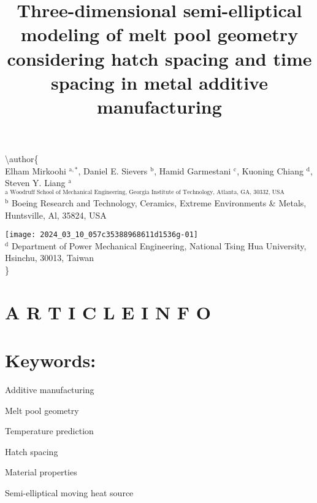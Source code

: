 \documentclass[10pt]{article}
\title{Three-dimensional semi-elliptical modeling of melt pool geometry considering hatch spacing and time spacing in metal additive manufacturing }
\author{}
\date{}
\begin{document}
\maketitle
\textbackslash author\{\\
Elham Mirkoohi ${ }^{\mathrm{a}, *}$, Daniel E. Sievers ${ }^{\mathrm{b}}$, Hamid Garmestani ${ }^{\mathrm{c}}$, Kuoning Chiang ${ }^{\mathrm{d}}$, Steven Y. Liang ${ }^{\mathrm{a}}$ \\
 ${ }^{\text {a Woodruff School of Mechanical Engineering, Georgia Institute of Technology, Atlanta, GA, 30332, USA }}$ \\
 ${ }^{\mathrm{b}}$ Boeing Research and Technology, Ceramics, Extreme Environments \& Metals, Huntsville, Al, 35824, USA

\texttt{[image: 2024\_03\_10\_057c35388968611d1536g-01]} \\
 ${ }^{\mathrm{d}}$ Department of Power Mechanical Engineering, National Tsing Hua University, Hsinchu, 30013, Taiwan\\
\}

\section*{A R T I C L E I N F O}
\section*{Keywords:}
Additive manufacturing

Melt pool geometry

Temperature prediction

Hatch spacing

Material properties

Semi-elliptical moving heat source
\end{document}
